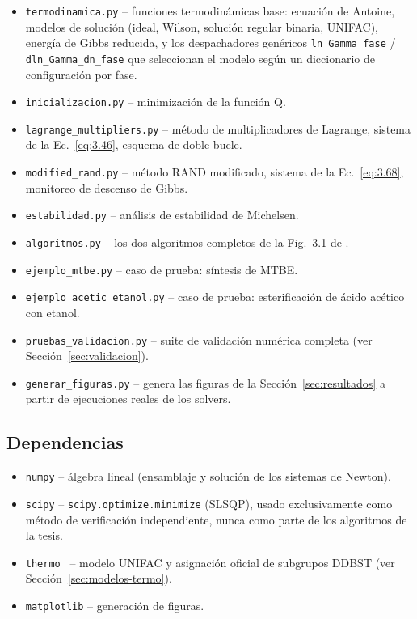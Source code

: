 \documentclass[11pt,a4paper]{article}
\begin{document}
\begin{itemize}
  \item \texttt{termodinamica.py} -- funciones termodinámicas base:
    ecuación de Antoine, modelos de solución (ideal, Wilson, solución
    regular binaria, UNIFAC), energía de Gibbs reducida, y los
    despachadores genéricos \texttt{ln\_Gamma\_fase} /
    \texttt{dln\_Gamma\_dn\_fase} que seleccionan el modelo según un
    diccionario de configuración por fase.
  \item \texttt{inicializacion.py} -- minimización de la función Q.
  \item \texttt{lagrange\_multipliers.py} -- método de multiplicadores
    de Lagrange, sistema de la Ec.~\eqref{eq:3.46}, esquema de doble
    bucle.
  \item \texttt{modified\_rand.py} -- método RAND modificado, sistema
    de la Ec.~\eqref{eq:3.68}, monitoreo de descenso de Gibbs.
  \item \texttt{estabilidad.py} -- análisis de estabilidad de
    Michelsen.
  \item \texttt{algoritmos.py} -- los dos algoritmos completos de la
    Fig.~3.1 de \citet{tsanas2018}.
  \item \texttt{ejemplo\_mtbe.py} -- caso de prueba: síntesis de MTBE.
  \item \texttt{ejemplo\_acetic\_etanol.py} -- caso de prueba:
    esterificación de ácido acético con etanol.
  \item \texttt{pruebas\_validacion.py} -- suite de validación numérica
    completa (ver Sección~\ref{sec:validacion}).
  \item \texttt{generar\_figuras.py} -- genera las figuras de la
    Sección~\ref{sec:resultados} a partir de ejecuciones reales de los
    solvers.
\end{itemize}

\subsection{Dependencias}

\begin{itemize}
  \item \texttt{numpy} -- álgebra lineal (ensamblaje y solución de los
    sistemas de Newton).
  \item \texttt{scipy} -- \texttt{scipy.optimize.minimize} (SLSQP), usado
    exclusivamente como método de verificación independiente, nunca
    como parte de los algoritmos de la tesis.
  \item \texttt{thermo}~\citep{bellthermo} -- modelo UNIFAC y
    asignación oficial de subgrupos DDBST (ver
    Sección~\ref{sec:modelos-termo}).
  \item \texttt{matplotlib} -- generación de figuras.
\end{itemize}
\end{document}
